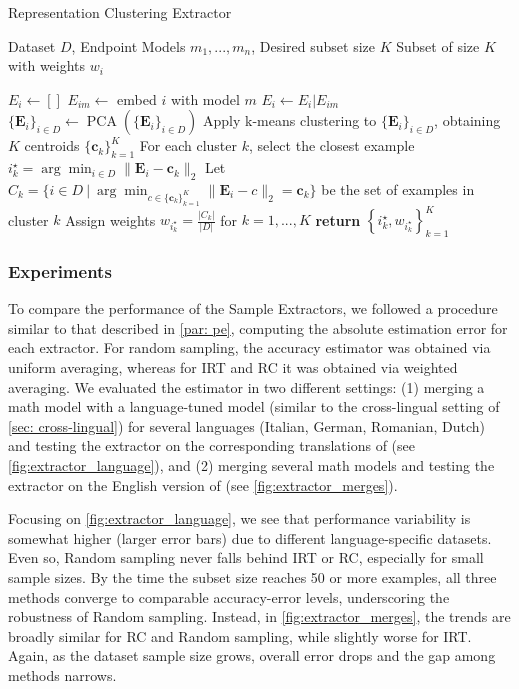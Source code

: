 \begin{algorithm}
\caption{Representation Clustering Extractor}\label{alg:repr-clust}
\begin{algorithmic}[1]
    \REQUIRE Dataset $D$, Endpoint Models $m_1,...,m_n$, Desired subset size $K$
    \ENSURE Subset of size $K$ with weights $w_i$

        \STATE $E_i \gets []$ 
        \STATE $E_{im} \gets$ embed $i$ with model $m$
        \STATE  $E_i \gets E_i | E_{im}$ 
        \ENDFOR
    \ENDFOR
    \STATE $\{\mathbf{E}_i\}_{i \in D} \gets \operatorname{PCA}(\{\mathbf{E}_i\}_{i \in D})$
    \STATE Apply k-means clustering to $\{\mathbf{E}_i\}_{i \in D}$, obtaining $K$ centroids $\{\mathbf{c}_k\}_{k=1}^K$
    \STATE For each cluster $k$, select the closest example $i_k^{\star} = \arg\min_{i \in D} \|\mathbf{E}_i - \mathbf{c}_k\|_2$
    \STATE Let $C_k = \{i \in D \ | \ \arg\min_{c \in \{\mathbf{c}_k\}_{k=1}^K} \|\mathbf{E}_i - c\|_2 = \mathbf{c}_k\}$ be the set of examples in cluster $k$
    \STATE Assign weights $w_{i_k^{\star}} = \frac{|C_k|}{|D|}$ for $k=1,...,K$
    \STATE \textbf{return}  $\left\{ i_k^{\star}, w_{i_k^{\star}} \right\}_{k=1}^{K}$
\end{algorithmic}
\end{algorithm}


\subsubsection{Experiments}
To compare the performance of the Sample Extractors, we followed a procedure similar to that described in \cref{par: pe}, computing the absolute estimation error for each extractor. For random sampling, the accuracy estimator was obtained via uniform averaging, whereas for IRT and RC it was obtained via weighted averaging. We evaluated the estimator in two different settings: (1) merging a math model with a language-tuned model (similar to the cross-lingual setting of \cref{sec: cross-lingual}) for several languages (Italian, German, Romanian, Dutch) and testing the extractor on the corresponding translations of  (see \cref{fig:extractor_language}), and (2) merging several math models and testing the extractor on the English version of  (see \cref{fig:extractor_merges}).

Focusing on \cref{fig:extractor_language}, we see that performance variability is somewhat higher (larger error bars) due to different language-specific datasets. Even so, Random sampling never falls behind IRT or RC, especially for small sample sizes. By the time the subset size reaches 50 or more examples, all three methods converge to comparable accuracy-error levels, underscoring the robustness of Random sampling. Instead, in \cref{fig:extractor_merges}, the trends are broadly similar for RC and Random sampling, while slightly worse for IRT.  Again, as the dataset sample size grows, overall error drops and the gap among methods narrows. 

